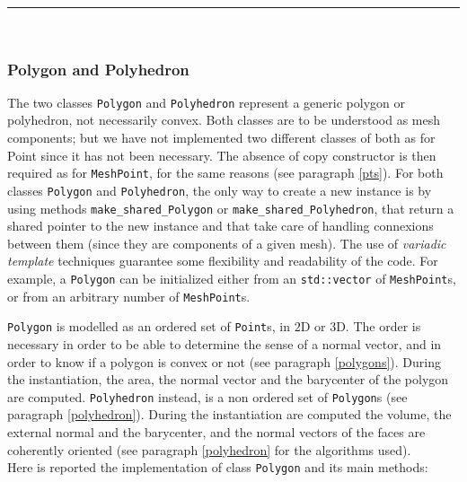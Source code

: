 \noindent\rule{12.7cm}{1pt}\\

\subsubsection{Polygon and Polyhedron}
The two classes \verb|Polygon| and \verb|Polyhedron| represent a generic polygon or polyhedron, not necessarily convex. Both classes are to be understood as mesh components; but we have not implemented two different classes of both as for Point since it has not been necessary. The absence of copy constructor is then required as for \verb|MeshPoint|, for the same reasons (see paragraph \ref{pts}). For both classes \verb|Polygon| and \verb|Polyhedron|, the only way to create a new instance is by using methods \verb|make_shared_Polygon| or \verb|make_shared_Polyhedron|, that return a shared pointer to the new instance and that take care of handling connexions between them (since they are components of a given mesh). 
The use of \textit{variadic template} techniques guarantee some flexibility and readability of the code. For example, a \verb|Polygon| can be initialized either from an \verb|std::vector| of \verb|MeshPoint|s, or from an arbitrary number of \verb|MeshPoint|s. 

\verb|Polygon| is modelled as an ordered set of \verb|Point|s, in $2$D or $3$D. The order is necessary in order to be able to determine the sense of a normal vector, and in order to know if a polygon is convex or not (see paragraph \ref{polygons}). During the instantiation, the area, the normal vector and the barycenter of the polygon are computed. \verb|Polyhedron| instead, is a non ordered set of \verb|Polygon|s (see paragraph \ref{polyhedron}). During the instantiation are computed the volume, the external normal and the barycenter, and the normal vectors of the faces are coherently oriented (see paragraph \ref{polyhedron} for the algorithms used). \\

Here is reported the implementation of class \verb|Polygon| and its main methods:\\

